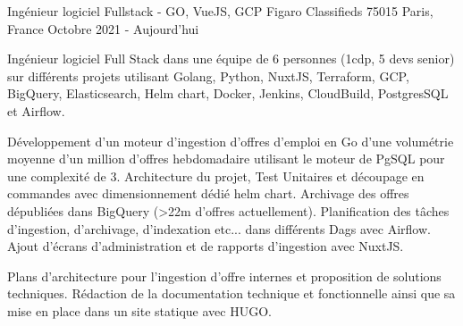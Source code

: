 \cventry
{Ingénieur logiciel Fullstack - GO, VueJS, GCP} %
{Figaro Classifieds} %
{75015 Paris, France} %
{Octobre 2021 - Aujourd'hui} %
{
    \begin{cvitems} %
        \item
        {
            Ingénieur logiciel Full Stack dans une équipe de 6 personnes (1cdp, 5 devs senior) sur différents projets
            utilisant Golang, Python, NuxtJS, Terraform, GCP, BigQuery, Elasticsearch, Helm chart, Docker, Jenkins,
            CloudBuild, PostgresSQL et Airflow.
        }
        \item
        {
            Développement d'un moteur d'ingestion d'offres d'emploi en Go d'une volumétrie moyenne d'un million d'offres
            hebdomadaire utilisant le moteur de PgSQL pour une complexité de 3. Architecture du projet, Test Unitaires et
            découpage en commandes avec dimensionnement dédié helm chart. Archivage des offres dépubliées dans BigQuery
            (>22m d'offres actuellement). Planification des tâches d'ingestion, d'archivage, d'indexation etc... dans
            différents Dags avec Airflow.
            Ajout d'écrans d'administration et de rapports d'ingestion avec NuxtJS.
        }
        \item
        {
            Plans d'architecture pour l'ingestion d'offre internes et proposition de solutions techniques. Rédaction de
            la documentation technique et fonctionnelle ainsi que sa mise en place dans un site statique avec HUGO.
        }
    \end{cvitems}
}
